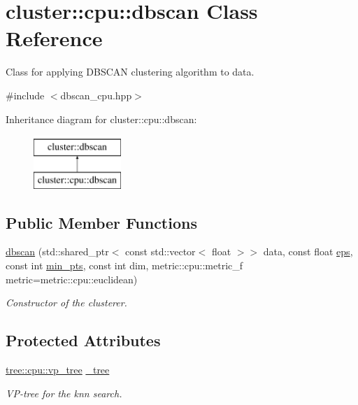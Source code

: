 \hypertarget{classcluster_1_1cpu_1_1dbscan}{}\section{cluster\+:\+:cpu\+:\+:dbscan Class Reference}
\label{classcluster_1_1cpu_1_1dbscan}


Class for applying D\+B\+S\+C\+A\+N clustering algorithm to data.  




{\ttfamily \#include $<$dbscan\+\_\+cpu.\+hpp$>$}

Inheritance diagram for cluster\+:\+:cpu\+:\+:dbscan\+:\begin{figure}[H]
\begin{center}
\leavevmode
\includegraphics[height=2.000000cm]{classcluster_1_1cpu_1_1dbscan}
\end{center}
\end{figure}
\subsection*{Public Member Functions}
\begin{DoxyCompactItemize}
\item 
\hyperlink{classcluster_1_1cpu_1_1dbscan_a48d1156c8eb000f2ae8a916b31b2d492}{dbscan} (std\+::shared\+\_\+ptr$<$ const std\+::vector$<$ float $>$$>$ data, const float \hyperlink{classcluster_1_1dbscan_adffe3dee8aede13ce2068552a38e4bb9}{eps}, const int \hyperlink{classcluster_1_1dbscan_a5f424fb02ca1d736fb07f9e214a01a65}{min\+\_\+pts}, const int dim, metric\+::cpu\+::metric\+\_\+f metric=metric\+::cpu\+::euclidean)
\begin{DoxyCompactList}\small\item\em Constructor of the clusterer. \end{DoxyCompactList}\end{DoxyCompactItemize}
\subsection*{Protected Attributes}
\begin{DoxyCompactItemize}
\item 
\hypertarget{classcluster_1_1cpu_1_1dbscan_a2834cc24b1a05284d8f2d18b3d9f7ae7}{}\hyperlink{classtree_1_1cpu_1_1vp__tree}{tree\+::cpu\+::vp\+\_\+tree} \hyperlink{classcluster_1_1cpu_1_1dbscan_a2834cc24b1a05284d8f2d18b3d9f7ae7}{\+\_\+tree}\label{classcluster_1_1cpu_1_1dbscan_a2834cc24b1a05284d8f2d18b3d9f7ae7}

\begin{DoxyCompactList}\small\item\em V\+P-\/tree for the knn search. \end{DoxyCompactList}\end{DoxyCompactItemize}


